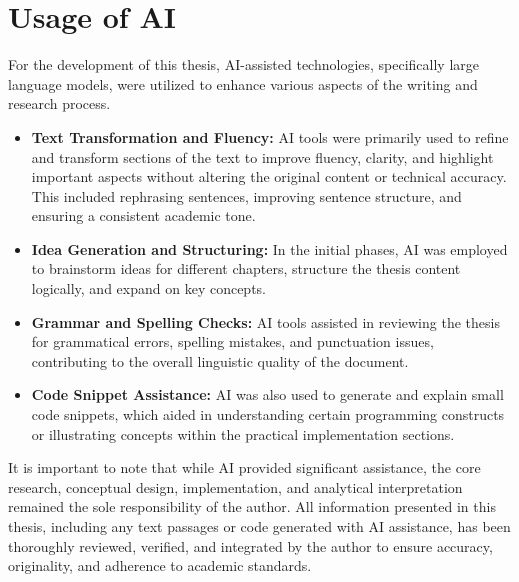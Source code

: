 \chapter{Usage of AI}


For the development of this thesis, AI-assisted technologies, specifically large language models, were utilized to enhance various aspects of the writing and research process.

\begin{itemize}
    \item \textbf{Text Transformation and Fluency:} AI tools were primarily used to refine and transform sections of the text to improve fluency, clarity, and highlight important aspects without altering the original content or technical accuracy. This included rephrasing sentences, improving sentence structure, and ensuring a consistent academic tone.
    \item \textbf{Idea Generation and Structuring:} In the initial phases, AI was employed to brainstorm ideas for different chapters, structure the thesis content logically, and expand on key concepts.
    \item \textbf{Grammar and Spelling Checks:} AI tools assisted in reviewing the thesis for grammatical errors, spelling mistakes, and punctuation issues, contributing to the overall linguistic quality of the document.
    \item \textbf{Code Snippet Assistance:} AI was also used to generate and explain small code snippets, which aided in understanding certain programming constructs or illustrating concepts within the practical implementation sections.
\end{itemize}

It is important to note that while AI provided significant assistance, the core research, conceptual design, implementation, and analytical interpretation remained the sole responsibility of the author. All information presented in this thesis, including any text passages or code generated with AI assistance, has been thoroughly reviewed, verified, and integrated by the author to ensure accuracy, originality, and adherence to academic standards.
